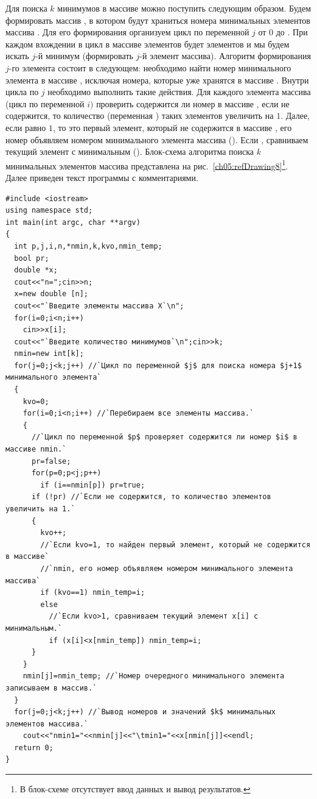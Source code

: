 Для поиска $k$ минимумов в массиве можно поступить следующим образом. Будем формировать массив
, в котором будут храниться номера минимальных элементов массива . Для его
формирования организуем цикл по переменной $j$ от 0 до . При
каждом вхождении в цикл в массиве  элементов будет  элементов и мы будем
искать $j$-й минимум (формировать $j$-й элемент массива). Алгоритм формирования
$j$-го элемента состоит в следующем: необходимо найти номер минимального элемента в массиве ,
исключая номера, которые уже хранятся в массиве . Внутри цикла по $j$
необходимо выполнить такие действия. Для каждого элемента массива  (цикл по переменной
$i)$ проверить содержится ли номер в массиве , если не содержится, то
количество (переменная ) таких элементов увеличить на $1$. Далее, если
 равно $1$, то это первый элемент, который не содержится в массиве
, его номер объявляем номером минимального элемента массива ().
Если , сравниваем текущий элемент
 с минимальным ().
Блок-схема алгоритма поиска $k$ минимальных элементов массива представлена на рис.~\ref{ch05:refDrawing8}\footnote{В
блок-схеме отсутствует ввод данных и вывод результатов.}.  Далее приведен текст программы с комментариями.
\begin{lstlisting}
#include <iostream>
using namespace std;
int main(int argc, char **argv)
{
  int p,j,i,n,*nmin,k,kvo,nmin_temp;
  bool pr;
  double *x;
  cout<<"n=";cin>>n;
  x=new double [n];
  cout<<"`Введите элементы массива Х`\n";
  for(i=0;i<n;i++)
    cin>>x[i];
  cout<<"`Введите количество минимумов`\n";cin>>k;
  nmin=new int[k];
  for(j=0;j<k;j++) //`Цикл по переменной $j$ для поиска номера $j+1$ минимального элемента`
  {
    kvo=0;
    for(i=0;i<n;i++) //`Перебираем все элементы массива.`
    {
      //`Цикл по переменной $p$ проверяет содержится ли номер $i$ в массиве nmin.`
      pr=false;
      for(p=0;p<j;p++)
        if (i==nmin[p]) pr=true;
      if (!pr) //`Если не содержится, то количество элементов увеличить на 1.`
      {
        kvo++;
        //`Если kvo=1, то найден первый элемент, который не содержится в массиве`
        //`nmin, его номер объявляем номером минимального элемента массива`
        if (kvo==1) nmin_temp=i;
        else
          //`Если kvo>1, сравниваем текущий элемент x[i] с минимальным.`
          if (x[i]<x[nmin_temp]) nmin_temp=i;
      }
    }
    nmin[j]=nmin_temp; //`Номер очередного минимального элемента записываем в массив.`		
  }
  for(j=0;j<k;j++) //`Вывод номеров и значений $k$ минимальных элементов массива.`
    cout<<"nmin1="<<nmin[j]<<"\tmin1="<<x[nmin[j]]<<endl;
  return 0;
}
\end{lstlisting}


